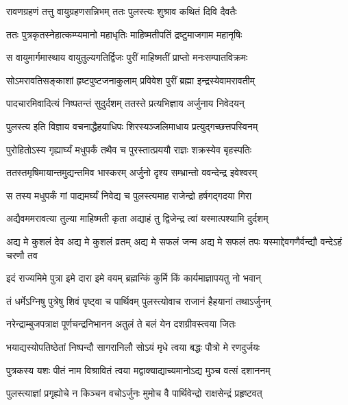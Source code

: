 
\twolineshloka
{रावणग्रहणं तत्तु वायुग्रहणसन्निभम्}
{ततः पुलस्त्यः शुश्राव कथितं दिवि दैवतैः} %

\twolineshloka
{ततः पुत्रकृतस्नेहात्कम्प्यमानो महाधृतिः}
{माहिष्मतीपतिं द्रष्टुमाजगाम महानृषिः} %

\twolineshloka
{स वायुमार्गमास्थाय वायुतुल्यगतिर्द्विजः}
{पुरीं माहिष्मतीं प्राप्तो मनःसम्पातविक्रमः} %

\twolineshloka
{सोऽमरावतिसङ्काशां हृष्टपुष्टजनाकुलाम्}
{प्रविवेश पुरीं ब्रह्मा इन्द्रस्येवामरावतीम्} %

\twolineshloka
{पादचारमिवादित्यं निष्पतन्तं सुदुर्दशम्}
{ततस्ते प्रत्यभिज्ञाय अर्जुनाय निवेदयन्} %

\twolineshloka
{पुलस्त्य इति विज्ञाय वचनाद्धैहयाधिपः}
{शिरस्यञ्जलिमाधाय प्रत्युद्गच्छत्तपस्विनम्} %

\twolineshloka
{पुरोहितोऽस्य गृह्यार्घ्यं मधुपर्कं तथैव च}
{पुरस्तात्प्रययौ राज्ञः शक्रस्येव बृहस्पतिः} %

\twolineshloka
{ततस्तमृषिमायान्तमुद्यन्तमिव भास्करम्}
{अर्जुनो दृश्य सम्भ्रान्तो ववन्देन्द्र इवेश्वरम्} %

\twolineshloka
{स तस्य मधुपर्कं गां पाद्यमर्घ्यं निवेद्य च}
{पुलस्त्यमाह राजेन्द्रो हर्षगद्गदया गिरा} %

\twolineshloka
{अद्यैवममरावत्या तुल्या माहिष्मती कृता}
{अद्याहं तु द्विजेन्द्र त्वां यस्मात्पश्यामि दुर्दशम्} %

\threelineshloka
{अद्य मे कुशलं देव अद्य मे कुशलं व्रतम्}
{अद्य मे सफलं जन्म अद्य मे सफलं तपः}
{यस्माद्देवगणैर्वन्द्यौ वन्देऽहं चरणौ तव} %

\twolineshloka
{इदं राज्यमिमे पुत्रा इमे दारा इमे वयम्}
{ब्रह्मन्किं कुर्मि किं कार्यमाज्ञापयतु नो भवान्} %

\twolineshloka
{तं धर्मेऽग्निषु पुत्रेषु शिवं पृष्ट्वा च पार्थिवम्}
{पुलस्त्योवाच राजानं हैहयानां तथाऽर्जुनम्} %

\twolineshloka
{नरेन्द्राम्बुजपत्राक्ष पूर्णचन्द्रनिभानन}
{अतुलं ते बलं येन दशग्रीवस्त्वया जितः} %

\twolineshloka
{भयाद्यस्योपतिष्ठेतां निष्पन्दौ सागरानिलौ}
{सोऽयं मृधे त्वया बद्धः पौत्रो मे रणदुर्जयः} %

\twolineshloka
{पुत्रकस्य यशः पीतं नाम विश्रावितं त्वया}
{मद्वाक्याद्याच्यमानोऽद्य मुञ्च वत्सं दशाननम्} %

\twolineshloka
{पुलस्त्याज्ञां प्रगृह्योचे न किञ्चन वचोऽर्जुनः}
{मुमोच वै पार्थिवेन्द्रो राक्षसेन्द्रं प्रहृष्टवत्} %

